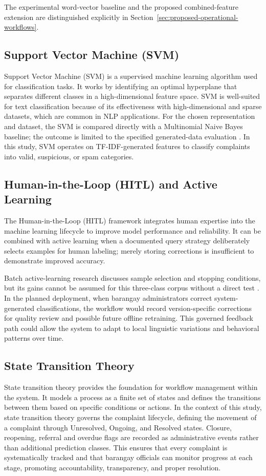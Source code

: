 The experimental word-vector baseline and the proposed combined-feature extension are distinguished explicitly in Section~\ref{sec:proposed-operational-workflows}.

\subsection{Support Vector Machine (SVM)}
Support Vector Machine (SVM) is a supervised machine learning algorithm used for classification tasks. It works by identifying an optimal hyperplane that separates different classes in a high-dimensional feature space. SVM is well-suited for text classification because of its effectiveness with high-dimensional and sparse datasets, which are common in NLP applications. For the chosen representation and dataset, the SVM is compared directly with a Multinomial Naive Bayes baseline; the outcome is limited to the specified generated-data evaluation \cite{sklearn}. In this study, SVM operates on TF-IDF-generated features to classify complaints into valid, suspicious, or spam categories.

\subsection{Human-in-the-Loop (HITL) and Active Learning}
The Human-in-the-Loop (HITL) framework integrates human expertise into the machine learning lifecycle to improve model performance and reliability. It can be combined with active learning when a documented query strategy deliberately selects examples for human labeling; merely storing corrections is insufficient to demonstrate improved accuracy.

Batch active-learning research discusses sample selection and stopping conditions, but its gains cannot be assumed for this three-class corpus without a direct test \cite{beatty2018,ghose2024}. In the planned deployment, when barangay administrators correct system-generated classifications, the workflow would record version-specific corrections for quality review and possible future offline retraining. This governed feedback path could allow the system to adapt to local linguistic variations and behavioral patterns over time.



\subsection{State Transition Theory}
State transition theory provides the foundation for workflow management within the system. It models a process as a finite set of states and defines the transitions between them based on specific conditions or actions. In the context of this study, state transition theory governs the complaint lifecycle, defining the movement of a complaint through Unresolved, Ongoing, and Resolved states. Closure, reopening, referral and overdue flags are recorded as administrative events rather than additional prediction classes. This ensures that every complaint is systematically tracked and that barangay officials can monitor progress at each stage, promoting accountability, transparency, and proper resolution.


